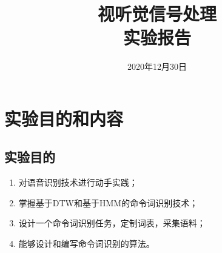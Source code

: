 \documentclass{hitreport}
\title{视听觉信号处理\\实验报告}
\date{2020年12月30日}
\begin{document}
\maketitle

\tableofcontents
\newpage




\section{实验目的和内容}

\subsection{实验目的}
\begin{enumerate}
\item 对语音识别技术进行动手实践；
\item 掌握基于DTW和基于HMM的命令词识别技术；
\item 设计一个命令词识别任务，定制词表，采集语料；
\item 能够设计和编写命令词识别的算法。
\end{enumerate}
\end{document}
